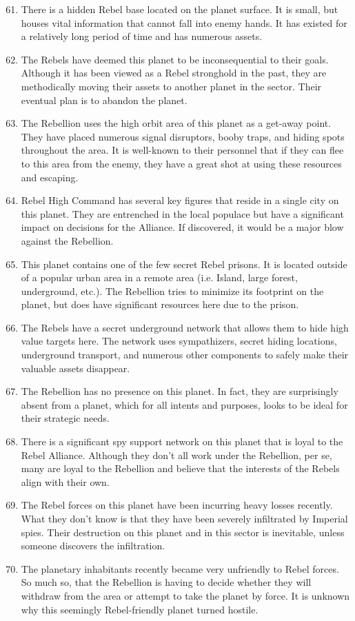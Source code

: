 \documentclass{article}
\begin{document}
\begin{enumerate}
	\setcounter{enumi}{60}
	\item There is a hidden Rebel base located on the planet surface. It is small, but houses vital information that cannot fall into enemy hands. It has existed for a relatively long period of time and has numerous assets.
	\item The Rebels have deemed this planet to be inconsequential to their goals. Although it has been viewed as a Rebel stronghold in the past, they are methodically moving their assets to another planet in the sector. Their eventual plan is to abandon the planet.
	\item The Rebellion uses the high orbit area of this planet as a get-away point. They have placed numerous signal disruptors, booby traps, and hiding spots throughout the area. It is well-known to their personnel that if they can flee to this area from the enemy, they have a great shot at using these resources and escaping.
	\item Rebel High Command has several key figures that reside in a single city on this planet. They are entrenched in the local populace but have a significant impact on decisions for the Alliance. If discovered, it would be a major blow against the Rebellion.
	\item This planet contains one of the few secret Rebel prisons. It is located outside of a popular urban area in a remote area (i.e. Island, large forest, underground, etc.). The Rebellion tries to minimize its footprint on the planet, but does have significant resources here due to the prison.
	\item The Rebels have a secret underground network that allows them to hide high value targets here. The network uses sympathizers, secret hiding locations, underground transport, and numerous other components to safely make their valuable assets disappear.
	\item The Rebellion has no presence on this planet. In fact, they are surprisingly absent from a planet, which for all intents and purposes, looks to be ideal for their strategic needs.
	\item There is a significant spy support network on this planet that is loyal to the Rebel Alliance. Although they don’t all work under the Rebellion, per se, many are loyal to the Rebellion and believe that the interests of the Rebels align with their own.
	\item The Rebel forces on this planet have been incurring heavy losses recently. What they don’t know is that they have been severely infiltrated by Imperial spies. Their destruction on this planet and in this sector is inevitable, unless someone discovers the infiltration.
	\item The planetary inhabitants recently became very unfriendly to Rebel forces. So much so, that the Rebellion is having to decide whether they will withdraw from the area or attempt to take the planet by force. It is unknown why this seemingly Rebel-friendly planet turned hostile.
\end{enumerate}
\end{document}
